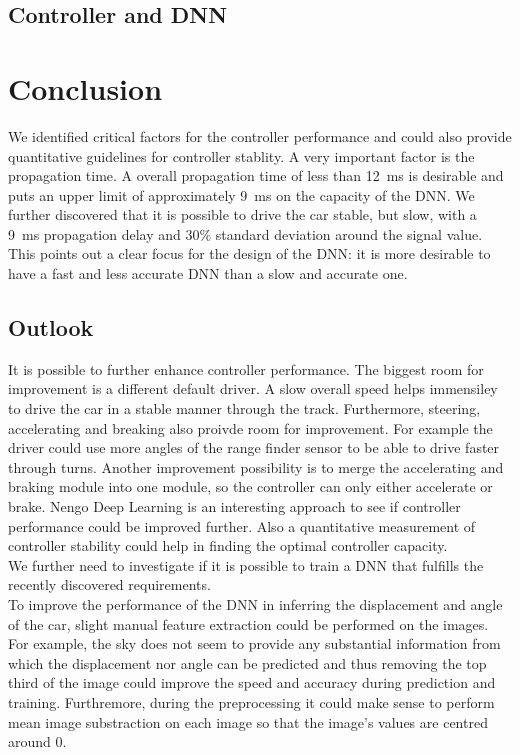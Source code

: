 \documentclass[10pt,a4paper,twoside,journal]{IEEEtran}
\begin{document}
\subsection{Controller and DNN}



\section{Conclusion}
\label{sc:conclusion}
We identified critical factors for the controller performance and could also provide quantitative guidelines for controller stablity. A very important factor is the propagation time. A overall propagation time of less than \SI{12}{\milli\second} is desirable and puts an upper limit of approximately \SI{9}{\milli\second} on the capacity of the DNN. We further discovered that it is possible to drive the car stable, but slow, with a \SI{9}{\milli\second} propagation delay and 30\% standard deviation around the signal value. This points out a clear focus for the design of the DNN: it is more desirable to have a fast and less accurate DNN than a slow and accurate one. \\

\subsection{Outlook}
\label{ssc:outlook}
It is possible to further enhance controller performance. The biggest room for improvement is a different default driver. A slow overall speed helps immensiley to drive the car in a stable manner through the track. Furthermore, steering, accelerating and breaking also proivde room for improvement. For example the driver could use more angles of the range finder sensor to be able to drive faster through turns. Another improvement possibility is to merge the accelerating and braking module into one module, so the controller can only either accelerate or brake. Nengo Deep Learning is an interesting approach to see if controller performance could be improved further. Also a quantitative measurement of controller stability could help in finding the optimal controller capacity. \\
We further need to investigate if it is possible to train a DNN that fulfills the recently discovered requirements. \\
To improve the performance of the DNN in inferring the displacement and angle of the car, slight manual feature extraction could be performed on the images. For example, the sky does not seem to provide any substantial information from which the displacement nor angle can be predicted and thus removing the top third of the image could improve the speed and accuracy during prediction and training. Furthremore, during the preprocessing it could make sense to perform mean image substraction on each image so that the image's values are centred around 0. 



\end{document}
